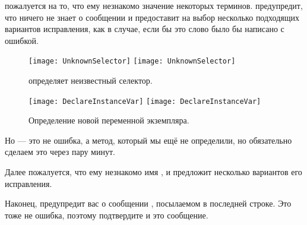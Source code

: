 \documentclass[a4paper,10pt,twoside]{book}
\begin{document}

\pharo пожалуется на то, что ему незнакомо значение некоторых терминов.
\pharo предупредит, что ничего не знает о сообщении  и предоставит на выбор несколько подходящих вариантов исправления, как в случае, если бы это слово было бы написано с ошибкой.


\begin{figure}[htb]
\begin{minipage}{0.48\textwidth}
	\centering
	\ifluluelse
		{\texttt{[image: UnknownSelector]}}
		{\texttt{[image: UnknownSelector]}}
	\caption{\pharo определяет неизвестный селектор.}
\end{minipage}
\hfill
\begin{minipage}{0.48\textwidth}
	\centering
	\ifluluelse
		{\texttt{[image: DeclareInstanceVar]}}
		{\texttt{[image: DeclareInstanceVar]}}
	\caption{Определение новой переменной экземпляра.\figlabel{declareInstance}}
\end{minipage}
\end{figure}

Но  --- это не ошибка, а метод, который мы ещё не определили, но обязательно сделаем это через пару минут.


Далее \pharo пожалуется, что ему незнакомо имя , и предложит несколько вариантов его исправления.

Наконец, \pharo предупредит вас о сообщении , посылаемом в последней строке. Это тоже не ошибка, поэтому подтвердите и это сообщение.
\end{document}
